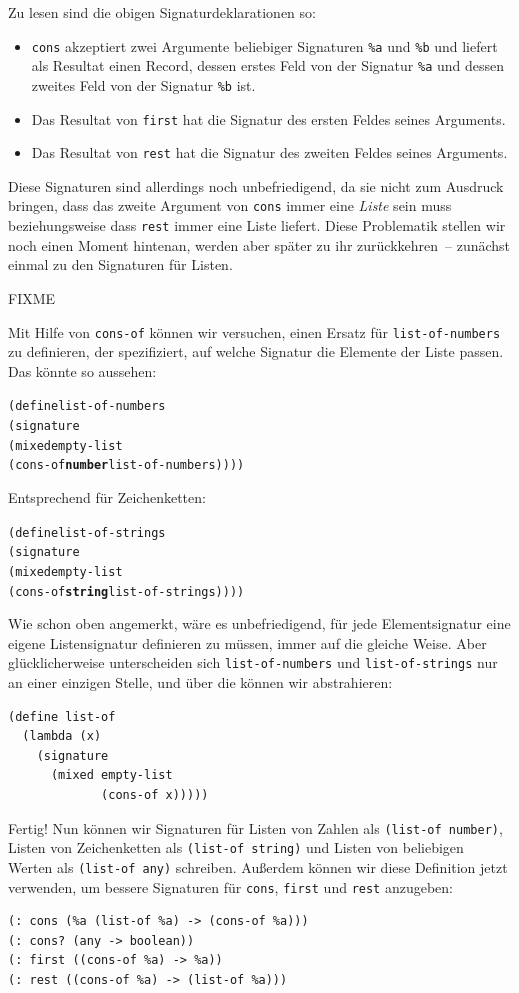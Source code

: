 Zu lesen sind die obigen Signaturdeklarationen so:
%
\begin{itemize}
\item \texttt{cons} akzeptiert zwei Argumente beliebiger Signaturen
  \verb|%a| und \verb|%b| und
  liefert als Resultat einen Record, dessen erstes Feld von der Signatur
  \verb|%a| und dessen zweites Feld von der Signatur \verb|%b| ist.
\item Das Resultat von \texttt{first} hat die
  Signatur des ersten Feldes seines Arguments.
\item Das Resultat von \texttt{rest} hat die
  Signatur des zweiten Feldes seines Arguments.
\end{itemize}
%

Diese Signaturen sind allerdings noch unbefriedigend, da sie nicht zum
Ausdruck bringen, dass das zweite Argument von \texttt{cons} immer
eine \emph{Liste} sein muss beziehungsweise dass \texttt{rest} immer
eine Liste liefert.  Diese Problematik stellen wir noch einen Moment
hintenan, werden aber später zu ihr zurückkehren~-- zunächst einmal zu
den Signaturen für Listen.

FIXME

Mit Hilfe von \texttt{cons-of} können wir versuchen, einen Ersatz für
\texttt{list-of-numbers} zu definieren, der spezifiziert, auf welche Signatur
die Elemente der Liste passen.  Das könnte so aussehen:
%
\begin{alltt}
(define list-of-numbers
  (signature
    (mixed empty-list
           (cons-of \textbf{number} list-of-numbers))))
\end{alltt}
%
Entsprechend für Zeichenketten:
%
\begin{alltt}
(define list-of-strings
  (signature
    (mixed empty-list
           (cons-of \textbf{string} list-of-strings))))
\end{alltt}
%
Wie schon oben angemerkt, wäre es unbefriedigend, für jede Elementsignatur eine
eigene Listensignatur definieren zu müssen, immer auf die gleiche
Weise.  Aber glücklicherweise unterscheiden sich
\texttt{list-of-numbers} und \texttt{list-of-strings} nur an einer
einzigen Stelle, und über die können wir abstrahieren:
%
\begin{verbatim}
(define list-of
  (lambda (x)
    (signature
      (mixed empty-list
             (cons-of x)))))
\end{verbatim}
%
Fertig!  Nun können wir Signaturen für Listen von Zahlen als
\texttt{(list-of number)}, Listen von Zeichenketten als
\texttt{(list-of string)} und Listen von beliebigen Werten als
\texttt{(list-of any)} schreiben.  Außerdem können wir diese
Definition jetzt verwenden, um bessere Signaturen für
\texttt{cons}, \texttt{first} und \texttt{rest} anzugeben:
%
\begin{verbatim}
(: cons (%a (list-of %a) -> (cons-of %a)))
(: cons? (any -> boolean))
(: first ((cons-of %a) -> %a))
(: rest ((cons-of %a) -> (list-of %a)))
\end{verbatim}
%

